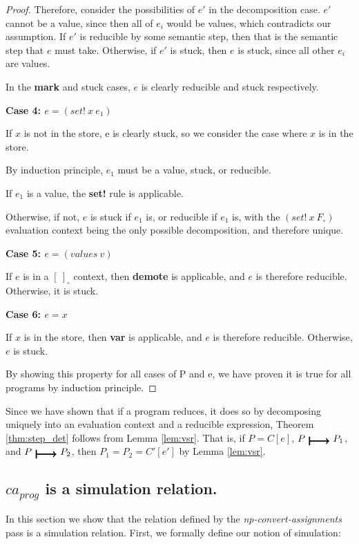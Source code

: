 \begin{proof}
Therefore, consider the possibilities of $e'$ in the decomposition case. $e'$ cannot be a value, since then all of $e_i$ would be values, which contradicts our assumption. If $e'$ is reducible by some semantic step, then that is the semantic step that $e$ must take. Otherwise, if $e'$ is stuck, then $e$ is stuck, since all other $e_i$ are values.

In the \textbf{mark} and stuck cases, $e$ is clearly reducible and stuck respectively.


\textbf{Case 4: $e = (set!\ x\ e_1)$}

If $x$ is not in the store, e is clearly stuck, so we consider the case where $x$ is in the store.

By induction principle, $e_1$ must be a value, stuck, or reducible.

If $e_1$ is a value, the \textbf{set!} rule is applicable.

Otherwise, if not, $e$ is stuck if $e_1$ is, or reducible if $e_1$ is, with the $(set!\ x\ F_{\circ})$ evaluation context being the only possible decomposition, and therefore unique.

\textbf{Case 5: $e = (values\ v)$}

If $e$ is in a $[\ ]_{\circ}$ context, then \textbf{demote} is applicable, and $e$ is therefore reducible. Otherwise, it is stuck.

\textbf{Case 6: $e = x$}

If $x$ is in the store, then \textbf{var} is applicable, and $e$ is therefore reducible. Otherwise, $e$ is stuck.

By showing this property for all cases of P and e, we have proven it is true for all programs by induction principle.
\end{proof}

Since we have shown that if a program reduces, it does so by decomposing uniquely into an evaluation context and a reducible expression, Theorem \ref{thm:step_det} follows from Lemma \ref{lem:vsr}. That is, if $P = C[e]$, $P\ \step\ P_1$, and $P\ \step\ P_2$, then $P_1 = P_2 = C'[e']$ by Lemma \ref{lem:vsr}.

\subsection{$ca_{prog}$ is a simulation relation.\label{sxn:sim}}
In this section we show that the relation defined by the \textit{np-convert-assignments} pass is a simulation relation. First, we formally define our notion of simulation:

